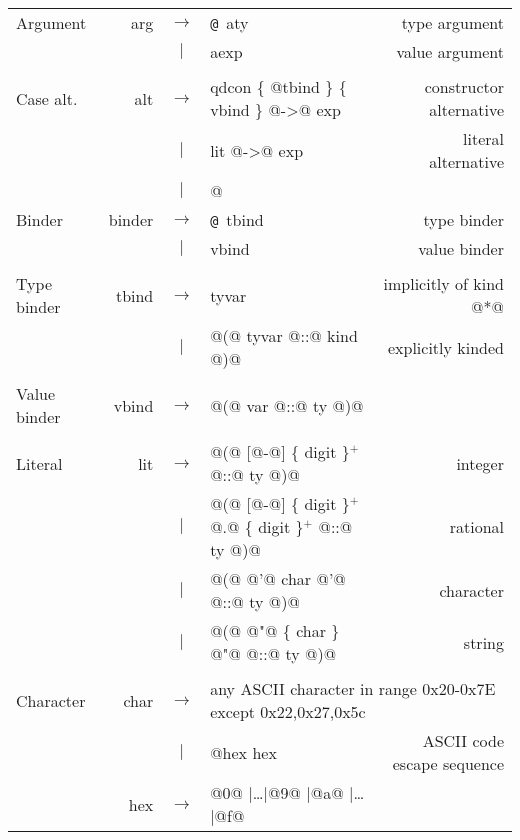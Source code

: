\documentclass[10pt]{article}
\makeatletter
\newcommand{\derives}{\mbox{$\rightarrow$}}
\newcommand{\orderives}{\mbox{$\mid$}}
\newcommand{\many}[1]{\{ {#1} \}}
\newcommand{\oneormore}[1]{\{ {#1} \}$^{+}$}
\newcommand{\at}{\texttt{@}}
\makeatother
\begin{document}
{\begin{tabular}{lrclr}
\\
{\rm Argument}   &	arg & 	\derives &	 \at\ aty &						{\rm type argument}\\
		 &	&	 \orderives &	 aexp &							{\rm value argument} \\
\\
{\rm Case alt.} &	alt &	 \derives &	qdcon  \many {@\at@ tbind} \many{vbind} @->@ exp &{\rm constructor alternative}\\
		&	&	 \orderives &	 lit @->@ exp &	 			{\rm literal alternative} \\
		&	&	 \orderives &	 @%
\\
{\rm Binder}	 & 	binder & \derives & \at\ tbind	&					{\rm type binder}\\
		 & 		& \orderives & 	vbind	&						{\rm value binder}\\
\\
{\rm Type binder} &	tbind & \derives   & tyvar & {\rm implicitly of  kind @*@} \\
                  &           & \orderives & @(@ tyvar @::@ kind @)@ & {\rm explicitly kinded} \\
\\
{\rm Value binder} & 	vbind & \derives &   @(@ var @::@ ty @)@ \\
\\
{\rm Literal} &	 lit &	 \derives &	 @(@ [@-@] \oneormore{digit} @::@ ty @)@ & {\rm integer} \\
	    &	&	 \orderives &	 @(@ [@-@] \oneormore{digit} @.@ \oneormore{digit} @::@ ty @)@ & {\rm rational} \\
	    &	&	 \orderives &	 @(@ @'@ char @'@ @::@ ty @)@ & {\rm character} \\
	    &	&	 \orderives &	 @(@ @"@ \many{char} @"@ @::@ ty @)@ & {\rm string} \\
\\
{\rm Character}  & char & \derives & \multicolumn{2}{l}{any ASCII character in range 0x20-0x7E except 0x22,0x27,0x5c}\\
		&	& \orderives & @\x@ hex hex  & {\rm ASCII code escape sequence} \\
		&  hex   & \derives & @0@ \orderives  \ldots \orderives  @9@ \orderives  @a@ \orderives  \ldots \orderives  @f@ \\
\end{tabular}

}
\end{document}
